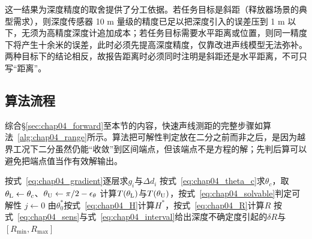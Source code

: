 这一结果为深度精度的取舍提供了分工依据。若任务目标是斜距（释放器场景的典型需求），则深度传感器 10 m 量级的精度已足以把深度引入的误差压到 1 m 以下，无须为高精度深度计追加成本；若任务目标需要水平距离或位置，则同一精度下将产生十余米的误差，此时必须先提高深度精度，仅靠改进声线模型无法弥补。两种目标下的结论相反，故报告距离时必须同时注明是斜距还是水平距离，不可只写“距离”。

\subsection{算法流程}

综合\S\ref{sec:chap04_forward}至本节的内容，快速声线测距的完整步骤如算法~\ref{alg:chap04_range}所示。算法把可解性判定放在二分之前而非之后，是因为越界工况下二分虽然仍能“收敛”到区间端点，但该端点不是方程的解；先判后算可以避免把端点值当作有效解输出。

\begin{algorithm}[htbp]
 \label{alg:chap04_range}
 按式~\eqref{eq:chap04_gradient}逐层求$g_i$与$\Delta d_i$\;
 按式~\eqref{eq:chap04_theta_c}求$\theta_c$，取$\theta_{\rm L}\leftarrow\theta_c$、$\theta_{\rm U}\leftarrow\pi/2-\epsilon_\theta$\;
 计算$T(\theta_{\rm L})$与$T(\theta_{\rm U})$，按式~\eqref{eq:chap04_solvable}判定可解性\;
 $j\leftarrow0$\;
 由$\theta_0^{*}$按式~\eqref{eq:chap04_H}计算$H^{*}$，按式~\eqref{eq:chap04_R}计算$R$\;
 按式~\eqref{eq:chap04_sens}与式~\eqref{eq:chap04_interval}给出深度不确定度引起的$\delta R$与$[R_{\min},R_{\max}]$\;
 \;
\end{algorithm}

